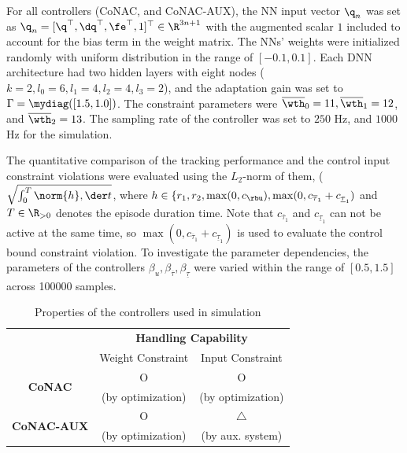\documentclass[final,5p,times,twocolumn,authoryear]{elsarticle}
\begin{document}
For all controllers (CoNAC, and CoNAC-AUX), the NN input vector ${\q}_n$ was set as ${\q}_n=[\q^\top,\dq^\top,\fe^\top,1]^\top\in\R^{3n+1}$ with the augmented scalar $1$ included to account for the bias term in the weight matrix. 
The NNs' weights were initialized randomly with uniform distribution in the range of $[-0.1,0.1]$.
Each DNN architecture had two hidden layers with eight nodes (\ie $k=2, l_0=6, l_1=4, l_2=4, l_3=2$), and the adaptation gain was set to $\Gamma=\mydiag([1.5,1.0])$. 
The constraint parameters were $\overline\wth_0=11, \overline\wth_1=12$, and $\overline\wth_2=13$. 
The sampling rate of the controller was set to $250$ Hz, and $1000$ Hz for the simulation.

The quantitative comparison of the tracking performance and the control input constraint violations were evaluated using the $L_2$-norm of them, (\ie $\sqrt{\int_0^T\norm{h},\der t}$, where $h\in\{r_1,r_2,\max(0,c_{\rbu}),\max(0,c_{\overline\tau_1}+c_{\underline\tau_1})$ and $T\in\R_{>0}$ denotes the episode duration time.
Note that $c_{\overline\tau_1}$ and $c_{\underline\tau_1}$ can not be active at the same time, so $\max(0,c_{\overline\tau_1}+c_{\underline\tau_1})$ is used to evaluate the control bound constraint violation.
To investigate the parameter dependencies, the parameters of the controllers $\beta_u,\beta_{\overline\tau},\beta_{\underline\tau}$  were varied within the range of  $[0.5,1.5]$ across 100000 samples.


\begin{table}[t]
    \renewcommand{\arraystretch}{1.3}
    \caption{Properties of the controllers used in simulation}
    \label{table:controller}
    \centering
    \begin{tabular}{c c c}
    \hline
        & \multicolumn{2}{c}{\bf{Handling Capability}}\\
        & Weight Constraint & Input Constraint\\
    \hline
    \hline
    \multirow{2}{*}{\bf{CoNAC}} & O & O \\
        & (by optimization) &  (by optimization)\\
    \hline
    \multirow{2}{*}{\bf{CoNAC-AUX}} & O & $\triangle$ \\
        & (by optimization) & (by aux. system)\\
    \hline
    \end{tabular}
\end{table}
\end{document}
